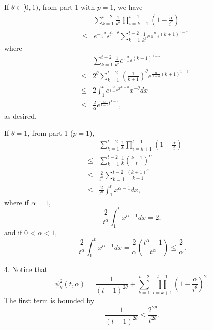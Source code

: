 \documentclass[twoside,twocolumn,journal]{IEEEtran}
\newenvironment{pf}[1][Proof]{\medskip\noindent\hspace{1em}{\itshape #1: }}{\hspace*{\fill}~\QED\par\endtrivlist\medskip}
\begin{document}
\begin{pf}
If $\theta\in [0,1)$, from part 1 with $p=1$, we have
\begin{eqnarray*}
& & \sum_{k=1}^{t-2} \frac{1}{k^\theta}\prod_{i=k+1}^{t-1} \left(1-\frac{\alpha}{i^\theta}\right) \\
& \leq & e^{-\frac{\alpha}{1-\theta}t^{1-\theta}} \sum_{k=1}^{t-2} \frac{1}{k^\theta}e^{\frac{\alpha}{1-\theta} (k+1)^{1-\theta}}
\end{eqnarray*}
where
\begin{eqnarray*}
& & \sum_{k=1}^{t-2} \frac{1}{k^\theta}e^{\frac{\alpha}{1-\theta} (k+1)^{1-\theta}} \\ & \leq & 2^\theta \sum_{k=1}^{t-2}
\left(\frac{1}{k+1}\right)^\theta e^{\frac{\alpha}{1-\theta} (k+1)^{1-\theta}} \\
& \leq & 2 \int_1^{t}  e^{\frac{\alpha}{1-\theta} x^{1-\theta}} x^{-\theta} d x \\
& \leq & \frac{2}{\alpha} e^{\frac{\alpha}{1-\theta}t^{1-\theta}},
\end{eqnarray*}
as desired.


If $\theta=1$, from part 1 ($p=1$),
\begin{eqnarray*}
& & \sum_{k=1}^{t-2} \frac{1}{k} \prod_{i=k+1}^{t-1} \left( 1 - \frac{\alpha}{i} \right) \\
& \leq & \sum_{k=1}^{t-2} \frac{1}{k}\left(\frac{k+1}{t}\right)^\alpha \\
& \leq & \frac{2}{t^\alpha} \sum_{k=1}^{t-2} \frac{(k+1)^\alpha}{k+1} \\
& \leq  & \frac{2}{t^\alpha} \int_1^{t} x^{\alpha-1} d x,
\end{eqnarray*}
where if $\alpha=1$,
\[ \frac{2}{t^\alpha} \int_1^{t} x^{\alpha-1} d x = 2; \]
and if $0<\alpha<1$,
\[ \frac{2}{t^\alpha} \int_1^{t} x^{\alpha-1} d x = \frac{2}{\alpha}\left(\frac{t^\alpha-1}{t^\alpha}\right) \leq \frac{2}{\alpha}.\]

4. Notice that
\[ \psi^2_\theta(t,\alpha) = \frac{1}{(t-1)^{2\theta}} + \sum_{k=1}^{t-2} \prod_{i=k+1}^{t-1}\left(1-\frac{\alpha}{i^\theta}\right)^2. \]
The first term is bounded by
\[ \frac{1}{(t-1)^{2\theta}} \leq \frac{2^{2\theta}}{t^{2\theta}}. \]


\end{pf}
\end{document}

